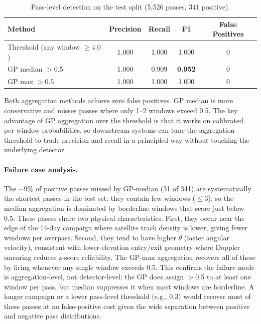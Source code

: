 \documentclass{article}
\begin{document}
\begin{table}[h]
\centering
\caption{Pass-level detection on the test split (5,526 passes, 341 positive).}
\label{tab:pass}
\begin{tabular}{lcccc}
\toprule
Method & Precision & Recall & F1 & False Positives \\
\midrule
Threshold (any window $\geq 4.0$) & 1.000 & 1.000 & 1.000 & 0 \\
GP median $> 0.5$                 & 1.000 & 0.909 & \textbf{0.952} & 0 \\
GP max $> 0.5$                    & 1.000 & 1.000 & 1.000 & 0 \\
\bottomrule
\end{tabular}
\end{table}

Both aggregation methods achieve zero false positives. GP median is more
conservative and misses passes where only 1--2 windows exceed 0.5.
The key advantage of GP aggregation over the threshold is that it works on
calibrated per-window probabilities, so downstream systems can tune the
aggregation threshold to trade precision and recall in a principled way
without touching the underlying detector.

\paragraph{Failure case analysis.}
The $\sim$9\% of positive passes missed by GP-median (31 of 341) are
systematically the shortest passes in the test set: they contain few windows
($\leq$3), so the median aggregation is dominated by borderline windows that
score just below 0.5.
These passes share two physical characteristics.
First, they occur near the edge of the 14-day campaign where satellite
track density is lower, giving fewer windows per overpass.
Second, they tend to have higher $\dot{\theta}$ (faster angular velocity),
consistent with lower-elevation entry/exit geometry where Doppler smearing
reduces z-score reliability.
The GP-max aggregation recovers all of these by firing whenever any single
window exceeds 0.5. This confirms the failure mode is aggregation-level, not
detector-level: the GP does assign $>$0.5 to at least one window per pass,
but median suppresses it when most windows are borderline.
A longer campaign or a lower pass-level threshold (e.g., 0.3) would recover
most of these passes at no false-positive cost given the wide separation
between positive and negative pass distributions.

\end{document}
